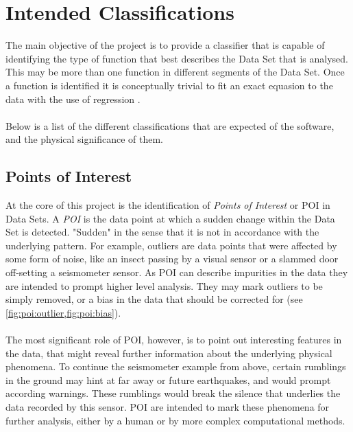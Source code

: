 \documentclass[main.tex]{subfiles}
\begin{document}
  
  
  \section{Intended Classifications}
  
    The main objective of the project is to provide a classifier that is capable of identifying the type of function that best describes the Data Set that is analysed. This may be more than one function in different segments of the Data Set. Once a function is identified it is conceptually trivial to fit an exact equasion to the data with the use of regression \cite{}. 
    \\\\
    Below is a list of the different classifications that are expected of the software, and the physical significance of them.
    
    \subsection{Points of Interest}  
    \label{sec:POI}
    
    At the core of this project is the identification of \textit{Points of Interest} or POI in Data Sets. A \textit{POI} is the data point at which a sudden change within the Data Set is detected. "Sudden" in the sense that it is not in accordance with the underlying pattern. For example, outliers are data points that were affected by some form of noise, like an insect passing by a visual sensor or a slammed door off-setting a seismometer sensor. As POI can describe impurities in the data they are intended to prompt higher level analysis. They may mark outliers to be simply removed, or a bias in the data that should be corrected for (see \cref{fig:poi:outlier,fig:poi:bias}). 
    \\\\
    The most significant role of POI, however, is to point out interesting features in the data, that might reveal further information about the underlying physical phenomena. To continue the seismometer example from above, certain rumblings in the ground may hint at far away or future earthquakes, and would prompt according warnings. These rumblings would break the silence that underlies the data recorded by this sensor. POI are intended to mark these phenomena for further analysis, either by a human or by more complex computational methods.
    
\end{document}
